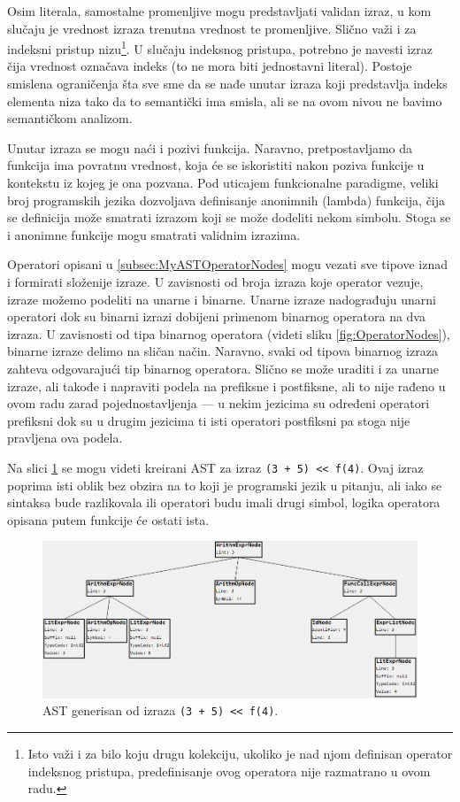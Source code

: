Osim literala, samostalne promenljive mogu predstavljati validan izraz, u kom slučaju je vrednost izraza trenutna vrednost te promenljive. Slično važi i za indeksni pristup nizu\footnote{Isto važi i za bilo koju drugu kolekciju, ukoliko je nad njom definisan operator indeksnog pristupa, predefinisanje ovog operatora nije razmatrano u ovom radu.}. U slučaju indeksnog pristupa, potrebno je navesti izraz čija vrednost označava indeks (to ne mora biti jednostavni literal). Postoje smislena ograničenja šta sve sme da se nađe unutar izraza koji predstavlja indeks elementa niza tako da to semantički ima smisla, ali se na ovom nivou ne bavimo semantičkom analizom. 

Unutar izraza se mogu naći i pozivi funkcija. Naravno, pretpostavljamo da funkcija ima povratnu vrednost, koja će se iskoristiti nakon poziva funkcije u kontekstu iz kojeg je ona pozvana. Pod uticajem funkcionalne paradigme, veliki broj programskih jezika dozvoljava definisanje anonimnih (lambda) funkcija, čija se definicija može smatrati izrazom koji se može dodeliti nekom simbolu. Stoga se i anonimne funkcije mogu smatrati validnim izrazima. 

Operatori opisani u \ref{subsec:MyASTOperatorNodes} mogu vezati sve tipove iznad i formirati složenije izraze. U zavisnosti od broja izraza koje operator vezuje, izraze možemo podeliti na unarne i binarne. Unarne izraze nadograđuju unarni operatori dok su binarni izrazi dobijeni primenom binarnog operatora na dva izraza. U zavisnosti od tipa binarnog operatora (videti sliku \ref{fig:OperatorNodes}), binarne izraze delimo na sličan način. Naravno, svaki od tipova binarnog izraza zahteva odgovarajući tip binarnog operatora. Slično se može uraditi i za unarne izraze, ali takođe i napraviti podela na prefiksne i postfiksne, ali to nije rađeno u ovom radu zarad pojednostavljenja --- u nekim jezicima su određeni operatori prefiksni dok su u drugim jezicima ti isti operatori postfiksni pa stoga nije pravljena ova podela.

Na slici \ref{fig:MyASTExampleExpressions} se mogu videti kreirani AST za izraz \texttt{(3 + 5) << f(4)}. Ovaj izraz poprima isti oblik bez obzira na to koji je programski jezik u pitanju, ali iako se sintaksa bude razlikovala ili operatori budu imali drugi simbol, logika operatora opisana putem funkcije će ostati ista.

\begin{figure}[h!]
\centering
\includegraphics[scale=0.6]{images/ast_expr.png}
\caption{AST generisan od izraza \texttt{(3 + 5) << f(4)}.}
\label{fig:MyASTExampleExpressions}
\end{figure}
